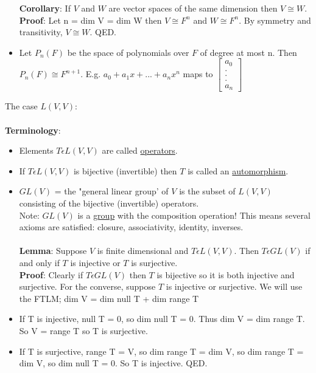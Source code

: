 \documentclass{article}
\begin{document}
\begin{itemize}
    \textbf{Corollary}: If $V$ and $W$ are vector spaces of the same dimension then $V \cong W$.\\
\textbf{Proof}: Let n = dim V = dim W then $V \cong F^n$ and $W \cong F^n$. By symmetry and transitivity, $V \cong W$. QED. 

\item Let $P_n(F)$ be the space of polynomials over $F$ of degree at most n. Then $P_n(F) \cong F^{n+1}$. E.g. $a_0 + a_1x + ... + a_nx^n$ maps to $\begin{bmatrix}
    a_0\\.\\.\\.\\a_n
\end{bmatrix}$
\end{itemize}

The case $L(V,V)$: \\\\
\textbf{Terminology}: 
\begin{itemize} 
\item Elements $T \epsilon L(V,V)$ are called \underline{operators}. 
\item If $T \epsilon L(V,V)$ is bijective (invertible) then $T$ is called an \underline{automorphism}.
\item $GL(V)$ = the "general linear group' of $V$ is the subset of $L(V,V)$ consisting of the bijective (invertible) operators. \\
Note: $GL(V)$ is a \underline{group} with the composition operation! This means several axioms are satisfied: closure, associativity, identity, inverses. \\\\
\textbf{Lemma}: Suppose $V$ is finite dimensional and $T \epsilon L(V,V)$. Then $T \epsilon GL(V)$ if and only if $T$ is injective or $T$ is surjective. \\
\textbf{Proof}: Clearly if $T \epsilon GL(V)$ then $T$ is bijective so it is both injective and surjective. For the converse, suppose $T$ is injective or surjective. We will use the FTLM; dim V = dim null T + dim range T
\item If T is injective, null T = 0, so dim null T = 0. Thus dim V = dim range T. So V = range T so T is surjective. 
\item If T is surjective, range T = V, so dim range T = dim V, so dim range T = dim V, so dim null T = 0. So T is injective. QED. 


\end{itemize}
\end{document}
